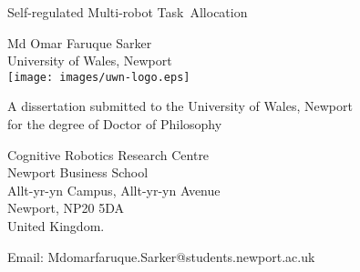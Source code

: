 %
%
%
%
\begin{titlepage}

\begin{center}
\noindent
\huge
Self-regulated Multi-robot Task~Allocation
\end{center}

\begin{center}
\noindent
\huge
Md Omar Faruque Sarker\\[10pt]
\large
University of Wales, Newport\\[16pt]
\texttt{[image: images/uwn-logo.eps]}
\end{center}

\begin{center}
\noindent
\large
A dissertation submitted to the University of Wales, Newport\\
for the degree of Doctor of Philosophy\\
\end{center}

\begin{center}
\noindent
Cognitive Robotics Research Centre\\
Newport Business School\\
Allt-yr-yn Campus, Allt-yr-yn Avenue\\
Newport, NP20 5DA\\
United Kingdom.\\
\end{center}

\begin{center}
\noindent
Email: Mdomarfaruque.Sarker@students.newport.ac.uk \\
\end{center}


\end{titlepage}
